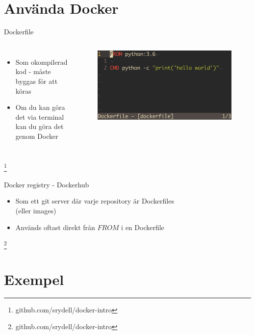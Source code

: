 \documentclass[12pt]{beamer}
\newcommand\blfootnote[1]{%
  \begingroup
  \renewcommand\thefootnote{}\footnote{#1}%
  \addtocounter{footnote}{-1}%
  \endgroup
}
\begin{document}
\section{Använda Docker}

\begin{frame}{Dockerfile}
   \begin{columns}
        \column{.25in}
        \column{2in}
        \begin{itemize}
            \item Som okompilerad kod - måste byggas för att köras
            \item Om du kan göra det via terminal kan du göra det genom Docker
        \end{itemize}
        \column{2.5in}
            \begin{figure}[h!]
                \centering
                \includegraphics[width=.8\textwidth]{../figures/simpleDockerfile.png}
            \end{figure}
    \end{columns}
    \blfootnote{github.com/srydell/docker-intro}
\end{frame}

\begin{frame}{Docker registry - Dockerhub}
    \begin{itemize}
        \item Som ett git server där varje repository är Dockerfiles \\(eller images)
        \item Används oftast direkt från $FROM$ i en Dockerfile
    \end{itemize}
    \blfootnote{github.com/srydell/docker-intro}
\end{frame}
\section{Exempel}
\end{document}
